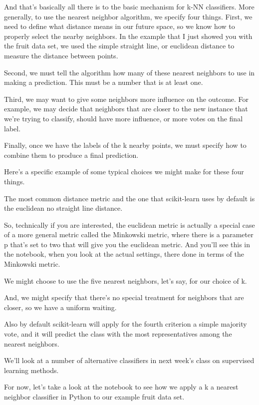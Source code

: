 \begin{multicols}{2}
And that's basically all there is to the basic mechanism for k-NN classifiers. More generally, to use the nearest neighbor algorithm, we specify four things. First, we need to define what distance means in our future space, so we know how to properly select the nearby neighbors. In the example that I just showed you with the fruit data set, we used the simple straight line, or euclidean distance to measure the distance between points. 

Second, we must tell the algorithm how many of these nearest neighbors to use in making a prediction. This must be a number that is at least one. 

Third, we may want to give some neighbors more influence on the outcome. For example, we may decide that neighbors that are closer to the new instance that we're trying to classify, should have more influence, or more votes on the final label. 

Finally, once we have the labels of the k nearby points, we must specify how to combine them to produce a final prediction. 

Here's a specific example of some typical choices we might make for these four things. 

The most common distance metric and the one that scikit-learn uses by default is the euclidean no straight line distance. 

So, technically if you are interested, the euclidean metric is actually a special case of a more general metric called the Minkowski metric, where there is a parameter p that's set to two that will give you the euclidean metric. And you'll see this in the notebook, when you look at the actual settings, there done in terms of the Minkowski metric. 

We might choose to use the five nearest neighbors, let's say, for our choice of k. 

And, we might specify that there's no special treatment for neighbors that are closer, so we have a uniform waiting. 

Also by default scikit-learn will apply for the fourth criterion a simple majority vote, and it will predict the class with the most representatives among the nearest neighbors. 

We'll look at a number of alternative classifiers in next week's class on supervised learning methods. 

For now, let's take a look at the notebook to see how we apply a k a nearest neighbor classifier in Python to our example fruit data set. 


\end{multicols}
